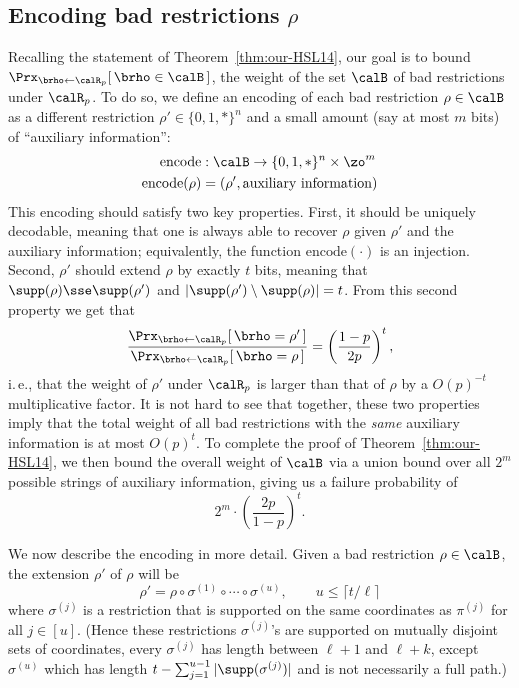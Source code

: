 \documentclass[11pt]{article}
\numberwithin{equation}{section}
\theoremstyle{definition}
\theoremstyle{plain}
\newcommand{\ie}{i.\,e.}
\theoremstyle{plain}
\newcommand{\encode}{\mathrm{encode}}
\begin{document}
\subsection{Encoding bad restrictions $\rho$} 

Recalling the statement of Theorem~\ref{thm:our-HSL14}, our goal is to bound $\Prx_{\brho\leftarrow\calR_p}[\, \text{$\brho \in \calB$}\,]$, the weight of the set $\calB$ of bad restrictions under $\calR_p$. To do so, we define an encoding of each bad restriction $\rho \in \calB$ as a different restriction $\rho' \in \{0,1,\ast\}^n$ and a small amount (say at most $m$ bits) of ``auxiliary information'':  
\begin{align*}
\encode &: \calB \to \{0,1,\ast\}^n \times \zo^m \\
\encode(\rho) &= (\rho', \text{auxiliary information}) 
\end{align*}
This encoding should satisfy two key properties. First, it should be uniquely decodable, meaning that one is always able to recover $\rho$ given $\rho'$ and the auxiliary information; equivalently, the function $\encode(\cdot)$ is an injection.  Second, $\rho'$ should extend $\rho$ by exactly $t$ bits, meaning that $\supp(\rho) \sse \supp(\rho')$ and $|\supp(\rho') \setminus \supp(\rho)| = t$.  From this second property we get that 
\[ \frac{\Prx_{\brho\leftarrow\calR_p}[\, \brho = \rho'\,]}{\Prx_{\brho\leftarrow\calR_p}[\,\brho = \rho\,]} = \left(\frac{1-p}{2p}\right)^t, \] 
\ie, that the weight of $\rho'$ under $\calR_p$ is larger than that of $\rho$ by a $O(p)^{-t}$ multiplicative factor.  It is not hard to see that together, these two properties imply that the total weight of all bad restrictions with the \emph{same} auxiliary information is at most $O(p)^t$.  To complete the proof of Theorem~\ref{thm:our-HSL14}, we then bound the overall weight of $\calB$ via a union bound over all $2^m$ possible strings of auxiliary information, giving us a failure probability of 
\begin{equation} 2^m \cdot \left(\frac{2p}{1-p}\right)^t. 
\label{eq:failure-probability}
\end{equation} 

We now describe the encoding in more detail.  Given a bad restriction $\rho \in \calB$, the extension $\rho'$ of $\rho$ will be 
\begin{equation} \rho' = \rho\circ \sigma^{(1)} \circ\cdots\circ\sigma^{(u)}, \qquad u \le \lceil t/\ell \rceil \label{eq:our-encoding}
\end{equation} 
where $\sigma^{(j)}$ is a restriction that is supported on the same coordinates as $\pi^{(j)}$ for all $j\in [u]$.  (Hence these restrictions $\sigma^{(j)}$'s are supported on mutually disjoint sets of coordinates, every $\sigma^{(j)}$ has length between $\ell + 1$ and $\ell+k$, except $\sigma^{(u)}$ which has length $t - \sum_{j=1}^{u-1} |\supp(\sigma^{(j)})|$ and is not necessarily a full path.) 
\end{document}
